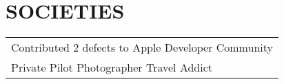\documentclass[a4paper]{lyu-resume} %
\begin{document}
\begin{minipage}[t]{0.66\textwidth}

\sectionspace %

\section{SOCIETIES} 

\begin{tabular}{l}
\textbullet{} Contributed 2 defects to Apple Developer Community\\
\textbullet{} Private Pilot \textbullet{} Photographer \textbullet{} Travel Addict
\end{tabular}

\sectionspace %
\end{minipage} %
\end{document}
